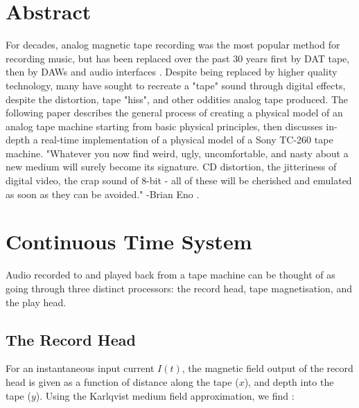 \documentclass[twoside,a4paper]{article}
\title{\papertitle}
\affiliation{
\paperauthorA \,}
{\href{http://ccrma.stanford.edu}{Center for Computer Research in Music and Acoustics} \\ Stanford University \\ Palo Alto, CA \\ {\tt \href{mailto:jatin@ccrma.stanford.edu}{jatin@ccrma.stanford.edu}}}
\newif\ifpdf
\begin{document}
\ifpdf %
  \DeclareGraphicsExtensions{.png,.jpg,.pdf}
\else  %
\fi

\maketitle

\section{Abstract}
For decades, analog magnetic tape recording was the most popular
method for recording music, but has been replaced over the past 30 years first by
DAT tape, then by DAWs and audio interfaces \cite{Kadis}. Despite being replaced
by higher quality technology, many have sought to recreate a "tape" sound
through digital effects, despite the distortion, tape "hiss", and other
oddities analog tape produced. The following paper describes the general process
of creating a physical model of an analog tape machine starting from basic
physical principles, then discusses in-depth a real-time implementation
of a physical model of a Sony TC-260 tape machine.
\newline\newline
"Whatever you now find weird, ugly, uncomfortable, and nasty
about a new medium will surely become its signature. CD distortion, the jitteriness
of digital video, the crap sound of 8-bit - all of these will be cherished
and emulated as soon as they can be avoided." -Brian Eno \cite{Eno}.

\section{Continuous Time System}
Audio recorded to and played back from a tape machine can be thought of as going
through three distinct processors: the record head, tape magnetisation, and the play
head.

\subsection{The Record Head}
For an instantaneous input current $I(t)$, the magnetic field output of the record 
head is given as a function of distance along the tape ($x$), and depth into 
the tape ($y$). Using the Karlqvist medium field approximation, we find
\cite{1994tmr..book.....B}:
\end{document}
